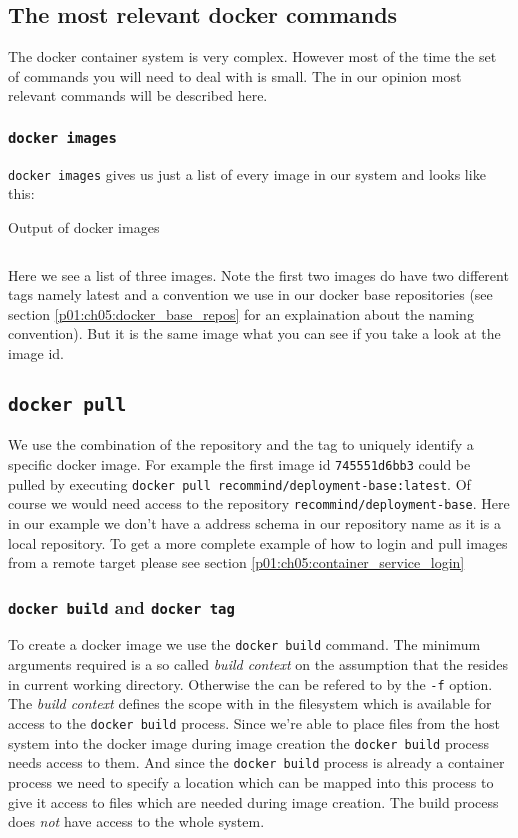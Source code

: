 		\subsection{The most relevant docker commands}
		The docker container system is very complex. However most of the time the set of commands you will need to deal with is small. The in our opinion most relevant commands will be described here.
			\subsubsection{\texttt{docker images}}
			\texttt{docker images} gives us just a list of every image in our system and looks like this:
			\begin{listing}[H]
				\caption{Output of docker images}
				\label{lst:p01:ch05:docker_images}
				\inputminted{text}{\relative{chapter_04/section_5.1.2/docker_images.lst}}
			\end{listing}
			Here we see a list of three images. Note the first two images do have two different tags namely latest and a convention we use in our docker base repositories (see section \ref{p01:ch05:docker_base_repos} for an explaination about the naming convention). But it is the same image what you can see if you take a look at the image id. 
			\subsection{\texttt{docker pull}}
			We use the combination of the repository and the tag to uniquely identify a specific docker image. For example the first image id \texttt{745551d6bb3} could be pulled by executing \texttt{docker pull recommind/deployment-base:latest}. Of course we would need access to the repository \texttt{recommind/deployment-base}. Here in our example we don't have a address schema in our repository name as it is a local repository. To get a more complete example of how to login and pull images from a remote target please see section \ref{p01:ch05:container_service_login}
			\subsubsection{\texttt{docker build} and \texttt{docker tag}}
			To create a docker image we use the \texttt{docker build} command. The minimum arguments required is a so called \emph{build context} on the assumption that the \dockerfile{} resides in current working directory. Otherwise the \dockerfile{} can be refered to by the \texttt{-f} option. The \emph{build context} defines the scope with in the filesystem which is available for access to the \texttt{docker build} process. Since we're able to place files from the host system into the docker image during image creation the \texttt{docker build} process needs access to them. And since the \texttt{docker build} process is already a container process we need to specify a location which can be mapped into this process to give it access to files which are needed during image creation. The build process does \emph{not} have access to the whole system.
			
